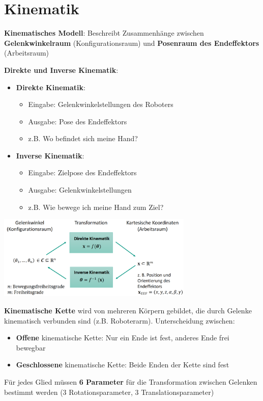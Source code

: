 \section{Kinematik}

\textbf{Kinematisches Modell}: Beschreibt Zusammenhänge zwischen \textbf{Gelenkwinkelraum} (Konfigurationsraum) und \textbf{Posenraum des Endeffektors} (Arbeitsraum)

\textbf{Direkte und Inverse Kinematik}:
\begin{itemize}
	\item \textbf{Direkte Kinematik}: 
	\begin{itemize}
		\item Eingabe: Gelenkwinkelstellungen des Roboters
		\item Ausgabe: Pose des Endeffektors
		\item z.B. Wo befindet sich meine Hand?
	\end{itemize}
	\item \textbf{Inverse Kinematik}: 
	\begin{itemize}
		\item Eingabe: Zielpose des Endeffektors
		\item Ausgabe: Gelenkwinkelstellungen
		\item z.B. Wie bewege ich meine Hand zum Ziel?
	\end{itemize}
\end{itemize}
\begin{center}
	\includegraphics[width=0.7\textwidth]{images/kinematik.png}
\end{center}
\medskip
\textbf{Kinematische Kette} wird von mehreren Körpern gebildet, die durch Gelenke kinematisch verbunden sind (z.B. Roboterarm). Unterscheidung zwischen:
\begin{itemize}
	\item \textbf{Offene} kinematische Kette: Nur ein Ende ist fest, anderes Ende frei bewegbar
	\item \textbf{Geschlossene} kinematische Kette: Beide Enden der Kette sind fest
\end{itemize}
Für jedes Glied müssen \textbf{6 Parameter} für die Transformation zwischen Gelenken bestimmt werden (3 Rotationsparameter, 3 Translationsparameter)
\pagebreak

